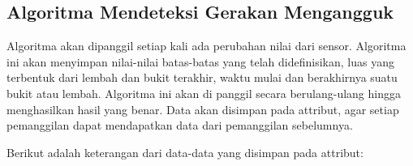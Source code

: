 \subsection{Algoritma Mendeteksi Gerakan Mengangguk}
\label{ssec:algoritma_mendeteksi_gerakan_mengangguk}

Algoritma akan dipanggil setiap kali ada perubahan nilai dari sensor. Algoritma ini akan menyimpan nilai-nilai batas-batas yang telah didefinisikan, luas yang terbentuk dari lembah dan bukit terakhir, waktu mulai dan berakhirnya suatu bukit atau lembah. Algoritma ini akan di panggil secara berulang-ulang hingga menghasilkan hasil yang benar. Data akan disimpan pada attribut, agar setiap pemanggilan dapat mendapatkan data dari pemanggilan sebelumnya. 

Berikut adalah keterangan dari data-data yang disimpan pada attribut:
